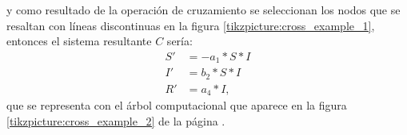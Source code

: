 




y como resultado de la operación de cruzamiento se seleccionan los nodos que se resaltan con líneas discontinuas en la figura \ref{tikzpicture:cross_example_1}, entonces el sistema resultante $C$ sería:
\begin{align*}
    S' & = - a_1 * S * I \\
    I' & = b_2 * S * I   \\
    R' & = a_4 * I,
\end{align*}
que se representa con el árbol computacional que aparece en la figura \ref{tikzpicture:cross_example_2} de la página \pageref{tikzpicture:cross_example_2}.

